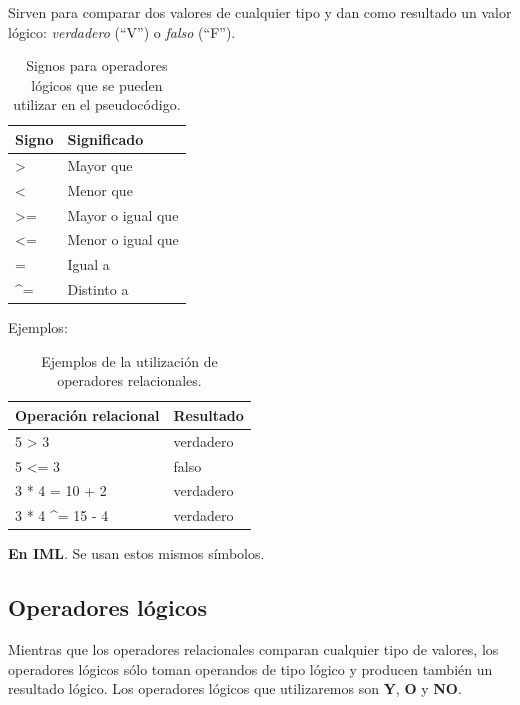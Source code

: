 \documentclass[]{book}
\begin{document}
Sirven para comparar dos valores de cualquier tipo y dan como resultado
un valor lógico: \emph{verdadero} (``V'') o \emph{falso} (``F'').

\begin{table}

\caption{\label{tab:unnamed-chunk-14}Signos para operadores lógicos que se pueden utilizar en el pseudocódigo.}
\centering
\begin{tabular}[t]{l|l}
\hline
Signo & Significado\\
\hline
> & Mayor que\\
\hline
< & Menor que\\
\hline
>= & Mayor o igual que\\
\hline
<= & Menor o igual que\\
\hline
= & Igual a\\
\hline
\textasciicircum{}= & Distinto a\\
\hline
\end{tabular}
\end{table}

Ejemplos:

\begin{table}

\caption{\label{tab:unnamed-chunk-15}Ejemplos de la utilización de operadores relacionales.}
\centering
\begin{tabular}[t]{l|l}
\hline
Operación relacional & Resultado\\
\hline
5 > 3 & verdadero\\
\hline
5 <= 3 & falso\\
\hline
3 * 4 = 10 + 2 & verdadero\\
\hline
3 * 4 \textasciicircum{}= 15 - 4 & verdadero\\
\hline
\end{tabular}
\end{table}

\textbf{En IML}. Se usan estos mismos símbolos.

\subsection{Operadores lógicos}\label{operadores-logicos}

Mientras que los operadores relacionales comparan cualquier tipo de
valores, los operadores lógicos sólo toman operandos de tipo lógico y
producen también un resultado lógico. Los operadores lógicos que
utilizaremos son \textbf{Y}, \textbf{O} y \textbf{NO}.
\end{document}
